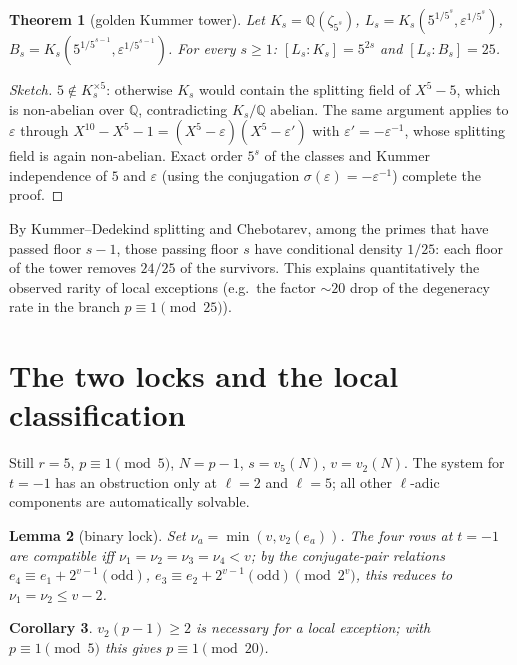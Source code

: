 \documentclass[11pt]{amsart}
\newtheorem{theorem}{Theorem}[section]
\newtheorem{lemma}[theorem]{Lemma}
\newtheorem{corollary}[theorem]{Corollary}
\theoremstyle{definition}
\theoremstyle{remark}
\newcommand{\Q}{\mathbb{Q}}
\newcommand{\eps}{\varepsilon}
\begin{document}
\begin{theorem}[golden Kummer tower]\label{thm:tower-global}
Let $K_s = \Q(\zeta_{5^s})$, $L_s = K_s(5^{1/5^s}, \eps^{1/5^s})$,
$B_s = K_s(5^{1/5^{s-1}}, \eps^{1/5^{s-1}})$. For every $s \ge 1$:
$[L_s : K_s] = 5^{2s}$ and $[L_s : B_s] = 25$.
\end{theorem}

\begin{proof}[Sketch]
$5 \notin K_s^{\times 5}$: otherwise $K_s$ would contain the splitting field
of $X^5 - 5$, which is non-abelian over $\Q$, contradicting
$K_s/\Q$ abelian. The same argument applies to $\eps$ through
$X^{10} - X^5 - 1 = (X^5-\eps)(X^5-\eps')$ with $\eps' = -\eps^{-1}$, whose
splitting field is again non-abelian. Exact order $5^s$ of the classes and
Kummer independence of $5$ and $\eps$ (using the conjugation
$\sigma(\eps) = -\eps^{-1}$) complete the proof.
\end{proof}

By Kummer--Dedekind splitting and Chebotarev, among the primes that have
passed floor $s-1$, those passing floor $s$ have conditional density
$1/25$: each floor of the tower removes $24/25$ of the survivors. This
explains quantitatively the observed rarity of local exceptions (e.g.\ the
factor ${\sim}20$ drop of the degeneracy rate in the branch
$p \equiv 1 \pmod{25}$).

\section{The two locks and the local classification}\label{sec:locks}

Still $r=5$, $p \equiv 1 \pmod 5$, $N = p-1$, $s = v_5(N)$, $v = v_2(N)$.
The system for $t = -1$ has an obstruction only at $\ell = 2$ and
$\ell = 5$; all other $\ell$-adic components are automatically solvable.

\begin{lemma}[binary lock]\label{lem:binary}
Set $\nu_a = \min(v, v_2(e_a))$. The four rows at $t = -1$ are compatible
iff $\nu_1 = \nu_2 = \nu_3 = \nu_4 < v$; by the conjugate-pair relations
$e_4 \equiv e_1 + 2^{v-1}(\mathrm{odd})$, $e_3 \equiv e_2 +
2^{v-1}(\mathrm{odd}) \pmod{2^v}$, this reduces to
$\nu_1 = \nu_2 \le v - 2$.
\end{lemma}

\begin{corollary}\label{cor:mod20}
$v_2(p-1) \ge 2$ is necessary for a local exception; with
$p \equiv 1 \pmod 5$ this gives $p \equiv 1 \pmod{20}$.
\end{corollary}
\end{document}
